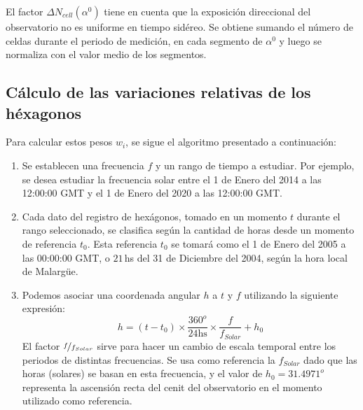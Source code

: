 El factor $\Delta N _{cell}(\alpha^0)$ tiene en cuenta que la exposición  direccional  del observatorio no es uniforme en tiempo sidéreo.  Se obtiene sumando el número de celdas durante el periodo de medición, en cada segmento de $\alpha^0$ y luego se normaliza con el valor medio de los segmentos.

\subsection{Cálculo de las variaciones relativas de los héxagonos}
Para calcular estos pesos $w_i$, se sigue el algoritmo presentado a continuación:
     
      \begin{enumerate}
        \item Se establecen una frecuencia $f$  y un rango de tiempo a estudiar. Por ejemplo, se desea estudiar la frecuencia solar entre el 1 de Enero del 2014 a las 12:00:00 GMT y el 1 de Enero del 2020 a las 12:00:00 GMT.

        \item Cada dato del registro de hexágonos, tomado en un momento $t$ durante el rango seleccionado, se clasifica según la cantidad de horas desde un momento de referencia $t_0$. Esta referencia $t_0$ se tomará como el 1 de Enero del 2005 a las 00:00:00 GMT, o  $21\,$hs del 31 de Diciembre del 2004, según la hora local de Malargüe.

        \item Podemos asociar una coordenada angular $h$ a $t$  y $f$  utilizando la siguiente expresión:
         \begin{equation}
          h = (t-t_0) \times \frac{360^o}{24\text{hs}} \times\frac{f}{f_{Solar}} + h_0
          \label{eq:h_horas} 
        \end{equation}
        El factor $\nicefrac{f}{f_{Solar}}$ sirve para hacer un cambio de escala temporal entre los periodos de distintas frecuencias. Se usa como referencia la $f_{Solar}$ dado que las horas (solares) se basan en esta frecuencia, y el valor de $h_0=31.4971^o$ representa la ascensión recta del cenit del observatorio en el momento utilizado como referencia.
        

\end{enumerate}
